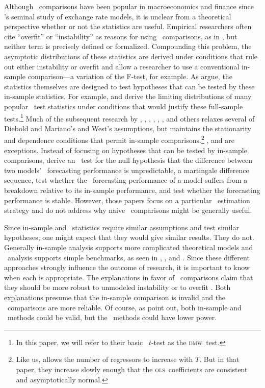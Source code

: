 \documentclass[11pt]{article}
\newcommand{\citepos}[1]{\citeauthor{#1}'s \citeyearpar{#1}}
\newcommand{\dmw}{\textsc{dmw}}
\newcommand{\ols}{\textsc{ols}}
\begin{document}
Although \oos\ comparisons have been popular in macroeconomics and
finance since \citepos{MeR:83} seminal study of exchange rate models,
it is unclear from a theoretical perspective whether or not the
statistics are useful.  Empirical researchers often cite ``overfit''
or ``instability'' as reasons for using \oos\ comparisons, as in
\citet{StW:03}, but neither term is precisely defined or formalized.
Compounding this problem, the asymptotic distributions of these
statistics are derived under conditions that rule out either
instability or overfit and allow a researcher to use a conventional
in-sample comparison---a variation of the F-test, for example.  As
\citet{InK:04} argue, the statistics themselves are designed to test
hypotheses that can be tested by these in-sample statistics.  For
example, \citet{DiM:95} and \citet{Wes:96} derive the limiting
distributions of many popular \oos\ test statistics under conditions
that would justify these full-sample tests.\footnote{In this paper, we
  will refer to their basic \oos\ $t$-test as the \dmw\ test.}  Much
of the subsequent research by \citet{CCS:01}, \citet{ClM:01,ClM:05},
\citet{CoS:02,CoS:04}, \citet{ClW:06,ClW:07}, \citet{Mcc:07},
\citet{Ana:07}, and others relaxes several of Diebold and Mariano's
and West's assumptions, but maintains the stationarity and dependence
conditions that permit in-sample comparisons.\footnote{Like us,
  \citet{Ana:07} allows the number of regressors to increase with $T$.
  But in that paper, they increase slowly enough that the \ols\
  coefficients are consistent and asymptotically normal.}
\citet{GiW:06}, and \citet{GiR:09, GiR:10} are exceptions.  Instead of
focusing on hypotheses that can be tested by in-sample comparisons,
\citet{GiW:06} derive an \oos\ test for the null hypothesis that the
difference between two models' \oos\ forecasting performance is
unpredictable, a martingale difference sequence, \citet{GiR:09} test
whether the \oos\ forecasting performance of a model suffers from a
breakdown relative to its in-sample performance, and \citet{GiR:10}
test whether the forecasting performance is stable. However, those
papers focus on a particular \oos\ estimation strategy and do not
address why naive \oos\ comparisons might be generally useful.

Since in-sample and \oos\ statistics require similar assumptions and
test similar hypotheses, one might expect that they would give similar
results.  They do not.  Generally in-sample analysis supports more
complicated theoretical models and \oos\ analysis supports simple
benchmarks, as seen in \citet{MeR:83}, \citet{StW:03}, and
\citet{GoW:08}.  Since these different approaches strongly influence
the outcome of research, it is important to know when each is
appropriate.  The explanations in favor of \oos\ comparisons claim
that they should be more robust to unmodeled instability
\citep{ClM:05,GiW:06,GiR:09,GiR:10} or to overfit
\citep{Mcc:98,Cla:04}.  Both explanations presume that the in-sample
comparison is invalid and the \oos\ comparisons are more reliable.  Of
course, as \citet{InK:04,InK:06} point out, both in-sample and \oos\
methods could be valid, but the \oos\ methods could have lower power.
\end{document}
